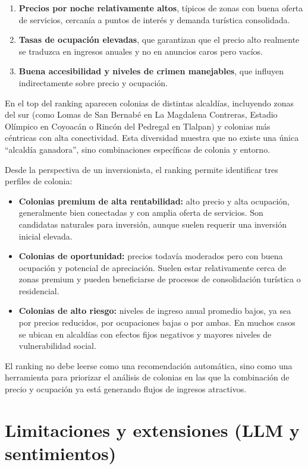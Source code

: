 \documentclass[12pt]{article}
\begin{document}
\begin{enumerate}
  \item \textbf{Precios por noche relativamente altos}, típicos de zonas con buena oferta de servicios, cercanía a puntos de interés y demanda turística consolidada.
  \item \textbf{Tasas de ocupación elevadas}, que garantizan que el precio alto realmente se traduzca en ingresos anuales y no en anuncios caros pero vacíos.
  \item \textbf{Buena accesibilidad y niveles de crimen manejables}, que influyen indirectamente sobre precio y ocupación.
\end{enumerate}

En el top del ranking aparecen colonias de distintas alcaldías, incluyendo zonas del sur (como Lomas de San Bernabé en La Magdalena Contreras, Estadio Olímpico en Coyoacán o Rincón del Pedregal en Tlalpan) y colonias más céntricas con alta conectividad. Esta diversidad muestra que no existe una única “alcaldía ganadora”, sino combinaciones específicas de colonia y entorno.

Desde la perspectiva de un inversionista, el ranking permite identificar tres perfiles de colonia:

\begin{itemize}
  \item \textbf{Colonias premium de alta rentabilidad:} alto precio y alta ocupación, generalmente bien conectadas y con amplia oferta de servicios. Son candidatas naturales para inversión, aunque suelen requerir una inversión inicial elevada.
  \item \textbf{Colonias de oportunidad:} precios todavía moderados pero con buena ocupación y potencial de apreciación. Suelen estar relativamente cerca de zonas premium y pueden beneficiarse de procesos de consolidación turística o residencial.
  \item \textbf{Colonias de alto riesgo:} niveles de ingreso anual promedio bajos, ya sea por precios reducidos, por ocupaciones bajas o por ambas. En muchos casos se ubican en alcaldías con efectos fijos negativos y mayores niveles de vulnerabilidad social.
\end{itemize}

El ranking no debe leerse como una recomendación automática, sino como una herramienta para priorizar el análisis de colonias en las que la combinación de precio y ocupación ya está generando flujos de ingresos atractivos.

\section{Limitaciones y extensiones (LLM y sentimientos)}
\end{document}
